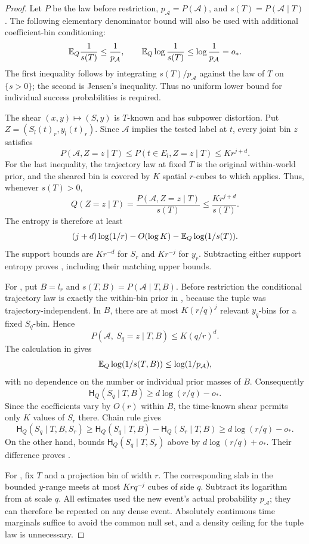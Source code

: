 \begin{proof}
Let \(P\) be the law before restriction, \(p_{\mathcal A}=P(\mathcal A)\),
and \(s(T)=P(\mathcal A\mid T)\).  The following elementary denominator
bound will also be used with additional coefficient-bin conditioning:
\begin{equation}\label{a04:denominator-entropy}
 \mathbb E_Q\frac1{s(T)}\le\frac1{p_{\mathcal A}},
 \qquad
 \mathbb E_Q\log\frac1{s(T)}\le\log\frac1{p_{\mathcal A}}=o_*.
\end{equation}
The first inequality follows by integrating \(s(T)/p_{\mathcal A}\)
against the law of \(T\) on \(\{s>0\}\); the second is Jensen's inequality.
Thus no uniform lower bound for individual success probabilities is
required.

The shear \((x,y)\mapsto(S,y)\) is \(T\)-known and has subpower distortion.
Put \(Z=(S_l(t)_r,y_l(t)_r)\).  Since \(\mathcal A\) implies the
tested label at \(t\), every joint bin \(z\) satisfies
\[
 P(\mathcal A,Z=z\mid T)
 \le P(t\in E_l,Z=z\mid T)\le Kr^{j+d}.
\]
For the last inequality, the trajectory law at fixed \(T\) is the
original within-world prior, and the sheared bin is covered by \(K\)
spatial \(r\)-cubes to which  applies.
Thus, whenever \(s(T)>0\),
\[
 Q(Z=z\mid T)=\frac{P(\mathcal A,Z=z\mid T)}{s(T)}
       \le\frac{Kr^{j+d}}{s(T)}.
\]
The entropy is therefore at least
\[
 (j+d)\log(1/r)-O(\log K)-\mathbb E_Q\log(1/s(T)).
\]
The support bounds are \(Kr^{-d}\) for \(S_r\) and \(Kr^{-j}\) for \(y_r\).
Subtracting either support entropy proves
, including their
matching upper bounds.

For , put \(B=l_r\) and
\(s(T,B)=P(\mathcal A\mid T,B)\).
Before restriction the conditional trajectory law is exactly the
within-bin prior in , because the tuple was
trajectory-independent.  In \(B\), there are at most
\(K(r/q)^j\) relevant \(y_q\)-bins for a fixed \(S_q\)-bin.
Hence
\[
 P(\mathcal A,\ S_q=z\mid T,B)\le K(q/r)^d.
\]
The calculation in  gives
\[
 \mathbb E_Q\log(1/s(T,B))\le\log(1/p_{\mathcal A}),
\]
with no dependence on the number or individual prior masses of \(B\).
Consequently
\[
 \mathsf H_Q(S_q\mid T,B)\ge d\log(r/q)-o_*.
\]
Since the coefficients vary by \(O(r)\) within \(B\), the time-known
shear permits only \(K\) values of \(S_r\) there.  Chain rule gives
\[
 \mathsf H_Q(S_q\mid T,B,S_r)
 \ge \mathsf H_Q(S_q\mid T,B)-\mathsf H_Q(S_r\mid T,B)
 \ge d\log(r/q)-o_*.
\]
On the other hand,  bounds
\(\mathsf H_Q(S_q\mid T,S_r)\) above by \(d\log(r/q)+o_*\).
Their difference proves .

For , fix \(T\) and a projection bin of
width \(r\).  The corresponding slab in the bounded \(y\)-range meets
at most \(Krq^{-j}\) cubes of side \(q\).
Subtract its logarithm from  at scale \(q\).
All estimates used the new event's actual probability
\(p_{\mathcal A}\); they can therefore be repeated on any dense event.
Absolutely continuous time marginals suffice to avoid the common null
set, and a density ceiling for the tuple law is unnecessary.
\end{proof}

